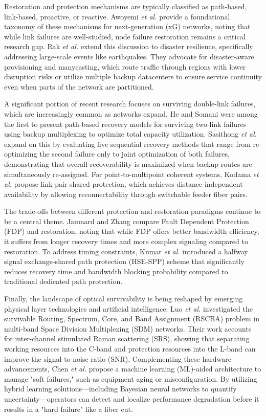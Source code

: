 \documentclass[conference]{IEEEtran}
\begin{document}
Restoration and protection mechanisms are typically classified as path-based, link-based, proactive, or reactive. Awoyemi \textit{et al.} \cite{awo18} provide a foundational taxonomy of these mechanisms for next-generation (xG) networks, noting that while link failures are well-studied, node failure restoration remains a critical research gap. Rak \textit{et al.} \cite{rak2021disaster} extend this discussion to disaster resilience, specifically addressing large-scale events like earthquakes. They advocate for disaster-aware provisioning and manycasting, which route traffic through regions with lower disruption risks or utilize multiple backup datacenters to ensure service continuity even when parts of the network are partitioned.

A significant portion of recent research focuses on surviving double-link failures, which are increasingly common as networks expand. He and Somani \cite{he03} were among the first to present path-based recovery models for surviving two-link failures using backup multiplexing to optimize total capacity utilization. Sasithong \textit{et al.} \cite{sasithong2020maximizing} expand on this by evaluating five sequential recovery methods that range from re-optimizing the second failure only to joint optimization of both failures, demonstrating that overall recoverability is maximized when backup routes are simultaneously re-assigned. For point-to-multipoint coherent systems, Kodama \textit{et al.} \cite{kodama2024double} propose link-pair shared protection, which achieves distance-independent availability by allowing reconnectability through switchable feeder fiber pairs.

The trade-offs between different protection and restoration paradigms continue to be a central theme. Jaumard and Zhang \cite{Jaumard2022revisiting} compare Fault Dependent Protection (FDP) and restoration, noting that while FDP offers better bandwidth efficiency, it suffers from longer recovery times and more complex signaling compared to restoration. To address timing constraints, Kumar \textit{et al.} \cite{Kumar2021Proactive} introduced a halfway signal exchange-shared path protection (HSE-SPP) scheme that significantly reduces recovery time and bandwidth blocking probability compared to traditional dedicated path protection.

Finally, the landscape of optical survivability is being reshaped by emerging physical layer technologies and artificial intelligence. Luo \textit{et al.} \cite{luo2022survivable} investigated the survivable Routing, Spectrum, Core, and Band Assignment (RSCBA) problem in multi-band Space Division Multiplexing (SDM) networks. Their work accounts for inter-channel stimulated Raman scattering (SRS), showing that separating working resources into the C-band and protection resources into the L-band can improve the signal-to-noise ratio (SNR). Complementing these hardware advancements, Chen \textit{et al.} \cite{Chen2022automating} propose a machine learning (ML)-aided architecture to manage "soft failures," such as equipment aging or misconfiguration. By utilizing hybrid learning solutions—including Bayesian neural networks to quantify uncertainty—operators can detect and localize performance degradation before it results in a "hard failure" like a fiber cut.
\end{document}
